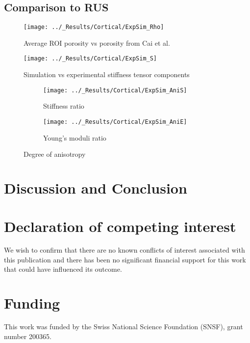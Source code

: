 \documentclass[a4paper,fleqn]{DC_ArtStyle}
\begin{document}
	\clearpage
	\subsection{Comparison to RUS}

	\begin{figure}[!h]
		\centering
			\texttt{[image: ../\_Results/Cortical/ExpSim\_Rho]}
			\caption{Average ROI porosity vs porosity from Cai et al.}
	\end{figure}

	\begin{figure}[!h]
		\centering
			\texttt{[image: ../\_Results/Cortical/ExpSim\_S]}
			\caption{Simulation vs experimental stiffness tensor components}
	\end{figure}

	\begin{figure*}
		\centering
		\begin{subfigure}[b]{0.45\linewidth}
			\texttt{[image: ../\_Results/Cortical/ExpSim\_AniS]}
			\caption{Stiffness ratio}
		\end{subfigure}
		\begin{subfigure}[b]{0.45\linewidth}
			\texttt{[image: ../\_Results/Cortical/ExpSim\_AniE]}
			\caption{Young's moduli ratio}
		\end{subfigure}
		\caption{Degree of anisotropy}
	\end{figure*}

	
	\clearpage
	\section{Discussion and Conclusion}
	
	
	\section*{Declaration of competing interest}
	We wish to confirm that there are no known conflicts of interest associated with this publication and there has been no significant financial support for this work that could have influenced its outcome.
	
	\section*{Funding}
	This work was funded by the Swiss National Science Foundation (SNSF), grant number 200365.
\end{document}
